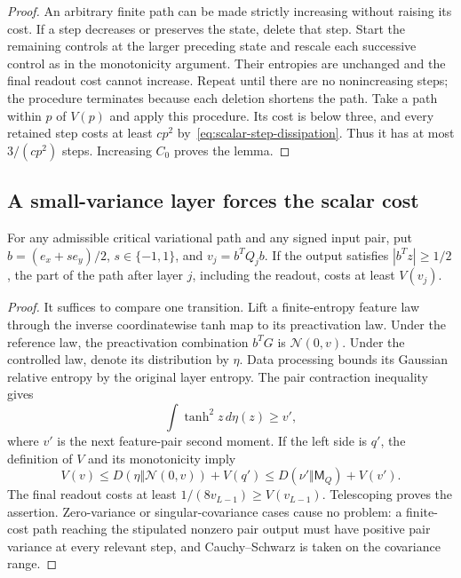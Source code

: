 \begin{proof}
An arbitrary finite path can be made strictly increasing without raising
its cost. If a step decreases or preserves the state, delete that step.
Start the remaining controls at the larger preceding state and rescale
each successive control as in the monotonicity argument. Their entropies
are unchanged and the final readout cost cannot increase. Repeat until
there are no nonincreasing steps; the procedure terminates because each
deletion shortens the path. Take a path within $p$ of $V(p)$ and apply
this procedure. Its cost is below three, and every retained step costs at
least $cp^2$ by~\eqref{eq:scalar-step-dissipation}. Thus it has at most
$3/(cp^2)$ steps. Increasing $C_0$ proves the lemma.
\end{proof}

\subsection{A small-variance layer forces the scalar cost}

\begin{lemma}
\label{lem:critical-pair-scalar-comparison}
For any admissible critical variational path and any signed input pair,
put $b=(e_x+se_y)/2$, $s\in\{-1,1\}$, and $v_j=b^TQ_jb$.
If the output satisfies $|b^Tz|\ge1/2$, the part of the path after
layer $j$, including the readout, costs at least $V(v_j)$.
\end{lemma}

\begin{proof}
It suffices to compare one transition. Lift a finite-entropy feature
law through the inverse coordinatewise tanh map to its preactivation
law. Under the reference law, the preactivation combination $b^TG$ is
$\mathcal N(0,v)$. Under the controlled law, denote its distribution by
$\eta$. Data processing bounds its Gaussian relative entropy by the
original layer entropy. The pair contraction inequality gives
\[
 \int\tanh^2z\,d\eta(z)\ge v',
\]
where $v'$ is the next feature-pair second moment. If the left side is
$q'$, the definition of $V$ and its monotonicity imply
\[
 V(v)\le D(\eta\Vert\mathcal N(0,v))+V(q')
       \le D(\nu'\Vert\mathsf M_Q)+V(v').
\]
The final readout costs at least $1/(8v_{L-1})\ge V(v_{L-1})$.
Telescoping proves the assertion. Zero-variance or singular-covariance
cases cause no problem: a finite-cost path reaching the stipulated
nonzero pair output must have positive pair variance at every relevant
step, and Cauchy--Schwarz is taken on the covariance range.
\end{proof}

